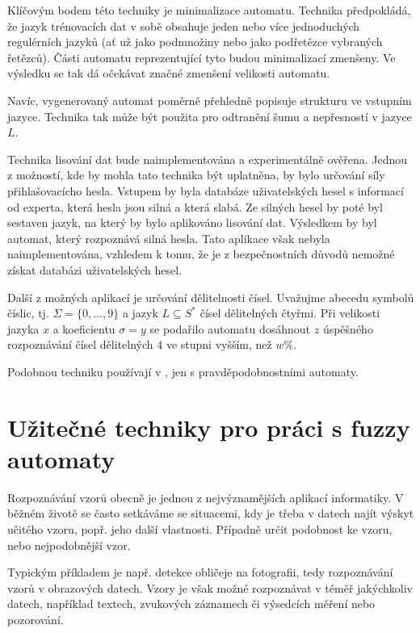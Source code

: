 \documentclass[a4paper,10pt]{article}
\begin{document}
Klíčovým bodem této techniky je minimalizace automatu. Technika předpokládá, že jazyk trénovacích dat v sobě obsahuje jeden nebo více jednoduchých regulérních jazyků (ať už jako podmnožiny nebo jako podřetězce vybraných řetězců). Části automatu reprezentující tyto  budou minimalizací zmenšeny. Ve výsledku se tak dá očekávat značné zmenšení velikosti automatu.

Navíc, vygenerovaný automat poměrně přehledně popisuje strukturu ve vstupním jazyce. Technika tak může být použita pro odtranění šumu a nepřesností v jazyce $L$.

Technika lisování dat bude naimplementována a experimentálně ověřena.  Jednou z možností, kde by mohla tato technika být uplatněna, by bylo určování síly přihlašovacícho hesla. Vstupem by byla databáze uživatelských hesel s informací od experta, která hesla jsou silná a která slabá. Ze silných hesel by poté byl sestaven jazyk, na který by bylo aplikováno lisování dat. Výsledkem by byl automat, který rozpoznává silná hesla. Tato aplikace však nebyla naimplementována, vzhledem k tomu, že je z bezpečnostních důvodů nemožné získat databázi uživatelských hesel.

Další z možných aplikací je určování dělitelnosti čísel. Uvažujme abecedu symbolů číslic, tj. $\Sigma = \{ 0, \dots, 9 \}$ a jazyk $L \subseteq S^*$ čísel dělitelných čtyřmi. Při velikosti jazyka $x$ a koeficientu $\sigma = y$ se podařilo automatu dosáhnout $z$ úspěšného rozpoznávání čísel dělitelných $4$ ve stupni vyšším, než $w\%$. 

Podobnou techniku používají v \cite{Hac+-ProAnaLarFinStaMac}, jen s pravděpodobnostními automaty.

\section{Užitečné techniky pro práci s fuzzy automaty}

Rozpoznávání vzorů obecně je jednou z nejvýznamějších aplikací informatiky. V běžném životě se často setkáváme se situacemi, kdy je třeba v datech najít výskyt učitého vzoru, popř. jeho další vlastnosti. Případně určit podobnost ke vzoru, nebo nejpodobnější vzor.

Typickým příkladem je např. detekce obličeje na fotografii, tedy rozpoznávání vzorů v obrazových datech. Vzory je však možné rozpoznávat v téměř jakýchkoliv datech, například textech, zvukových záznamech či výsedcích měření nebo pozorování.
\end{document}
